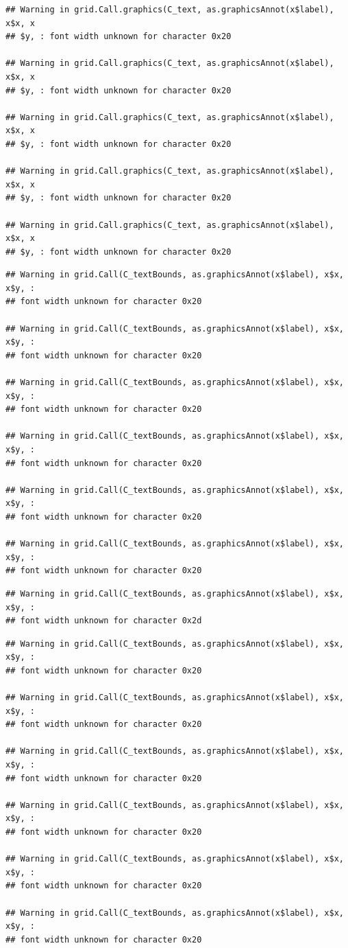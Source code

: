 \documentclass[]{article}
\theoremstyle{definition}
\theoremstyle{definition}
\theoremstyle{definition}
\theoremstyle{remark}
\begin{document}
\begin{verbatim}
## Warning in grid.Call.graphics(C_text, as.graphicsAnnot(x$label), x$x, x
## $y, : font width unknown for character 0x20

## Warning in grid.Call.graphics(C_text, as.graphicsAnnot(x$label), x$x, x
## $y, : font width unknown for character 0x20

## Warning in grid.Call.graphics(C_text, as.graphicsAnnot(x$label), x$x, x
## $y, : font width unknown for character 0x20

## Warning in grid.Call.graphics(C_text, as.graphicsAnnot(x$label), x$x, x
## $y, : font width unknown for character 0x20

## Warning in grid.Call.graphics(C_text, as.graphicsAnnot(x$label), x$x, x
## $y, : font width unknown for character 0x20
\end{verbatim}

\begin{verbatim}
## Warning in grid.Call(C_textBounds, as.graphicsAnnot(x$label), x$x, x$y, :
## font width unknown for character 0x20

## Warning in grid.Call(C_textBounds, as.graphicsAnnot(x$label), x$x, x$y, :
## font width unknown for character 0x20

## Warning in grid.Call(C_textBounds, as.graphicsAnnot(x$label), x$x, x$y, :
## font width unknown for character 0x20

## Warning in grid.Call(C_textBounds, as.graphicsAnnot(x$label), x$x, x$y, :
## font width unknown for character 0x20

## Warning in grid.Call(C_textBounds, as.graphicsAnnot(x$label), x$x, x$y, :
## font width unknown for character 0x20

## Warning in grid.Call(C_textBounds, as.graphicsAnnot(x$label), x$x, x$y, :
## font width unknown for character 0x20
\end{verbatim}

\begin{verbatim}
## Warning in grid.Call(C_textBounds, as.graphicsAnnot(x$label), x$x, x$y, :
## font width unknown for character 0x2d
\end{verbatim}

\begin{verbatim}
## Warning in grid.Call(C_textBounds, as.graphicsAnnot(x$label), x$x, x$y, :
## font width unknown for character 0x20

## Warning in grid.Call(C_textBounds, as.graphicsAnnot(x$label), x$x, x$y, :
## font width unknown for character 0x20

## Warning in grid.Call(C_textBounds, as.graphicsAnnot(x$label), x$x, x$y, :
## font width unknown for character 0x20

## Warning in grid.Call(C_textBounds, as.graphicsAnnot(x$label), x$x, x$y, :
## font width unknown for character 0x20

## Warning in grid.Call(C_textBounds, as.graphicsAnnot(x$label), x$x, x$y, :
## font width unknown for character 0x20

## Warning in grid.Call(C_textBounds, as.graphicsAnnot(x$label), x$x, x$y, :
## font width unknown for character 0x20
\end{verbatim}
\end{document}
